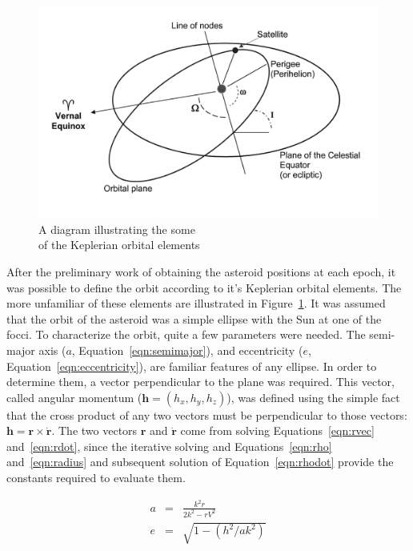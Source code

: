 \documentclass[a4paper,12pt]{article}
\begin{document}
\begin{figure}
\includegraphics[scale = 0.12]{orbitalelements2.png}
\caption{A diagram illustrating the some \\of the Keplerian orbital elements \citep{elements}}
\label{fig:elements}
\end{figure}

After the preliminary work of obtaining the asteroid positions at each epoch, it was possible to define the orbit according to it's Keplerian orbital elements. The more unfamiliar of these elements are illustrated in Figure~\ref{fig:elements}. It was assumed that the orbit of the asteroid was a simple ellipse with the Sun at one of the focci. To characterize the orbit, quite a few parameters were needed. The semi-major axis ($a$, Equation~\ref{eqn:semimajor}), and eccentricity ($e$, Equation~\ref{eqn:eccentricity}), are familiar features of any ellipse. In order to determine them, a vector perpendicular to the plane was required. This vector, called angular momentum ($\mathbf{h} = (h_x,h_y,h_z)$), was defined using the simple fact that the cross product of any two vectors must be perpendicular to those vectors: $\mathbf{h} = \mathbf{r}\times\mathbf{\dot{r}}$. The two vectors $\mathbf{r}$ and $\mathbf{\dot{r}}$ come from solving Equations~\ref{eqn:rvec} and~\ref{eqn:rdot}, since the iterative solving and Equations~\ref{eqn:rho} and~\ref{eqn:radius} and subsequent solution of Equation~\ref{eqn:rhodot} provide the constants required to evaluate them.

\begin{eqnarray}
\label{eqn:semimajor}
a &=& \frac{k^2r}{2k^2-rV^2}\\
\label{eqn:eccentricity}
e &=& \sqrt{1-(h^2/ak^2)}
\end{eqnarray}
\end{document}
